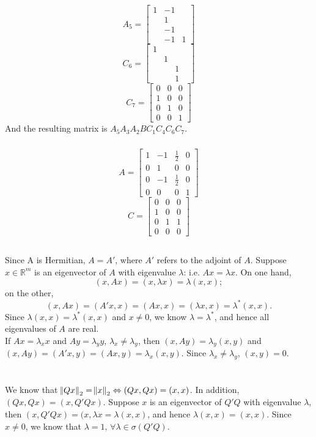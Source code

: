 \documentclass[11pt]{article}
\begin{document}
$$A_5=\begin{bmatrix} 1&-1\\&1\\&-1\\&-1&1\end{bmatrix} $$
$$C_6=\begin{bmatrix} 1\\&1\\&&1\\&&1&\end{bmatrix}$$
$$C_7=\begin{bmatrix} 0&0&0\\1&0&0\\0&1&0\\0&0&1\end{bmatrix} $$
And the resulting matrix is $A_5A_3A_2BC_1C_4C_6C_7$. 
\subsubsection{}
$$A=\begin{bmatrix} 1&-1&\frac12&0\\0&1&0&0\\0&-1&\frac12&0\\0&0&0&1\end{bmatrix} $$
$$C=\begin{bmatrix} 0&0&0\\1&0&0\\0&1&1\\0&0&0\end{bmatrix} $$
\subsection{}
Since A is Hermitian, $A=A'$, where $A'$ refers to the adjoint of $A$. Suppose $x\in\mathbb{R}^m$ is an eigenvector of $A$ with eigenvalue $\lambda$: i.e. $Ax=\lambda x$. On one hand, $$(x,Ax)=(x, \lambda x) = \lambda(x,x);$$ on the other, $$(x,Ax)=(A'x, x)=(Ax,x)=(\lambda x,x)=\lambda^*(x,x).$$ Since $\lambda(x,x)=\lambda^*(x,x)$ and $x\neq0$, we know $\lambda=\lambda^*$, and hence all eigenvalues of $A$ are real.  \\[0.5cm]
If $Ax=\lambda_xx$ and $Ay=\lambda_yy$, $\lambda_x\neq\lambda_y$, then $(x,Ay) = \lambda_y(x,y)$ and $(x,Ay)=(A'x,y)=(Ax,y)=\lambda_x(x,y)$. Since $\lambda_x\neq\lambda_y$, $(x,y)=0$. 
\section{}
\subsection{}
We know that $\norm{Qx}_2=\norm{x}_2\Leftrightarrow(Qx,Qx)=(x,x)$. In addition, $(Qx, Qx)=(x,Q'Qx)$. Suppose $x$ is an eigenvector of $Q'Q$ with eigenvalue $\lambda$, then $(x,Q'Qx)=(x,\lambda x=\lambda(x,x)$, and hence $\lambda(x,x)=(x,x)$. Since $x\neq0$, we know that $\lambda=1,\,\forall\lambda\in\sigma(Q'Q)$.
\end{document}
